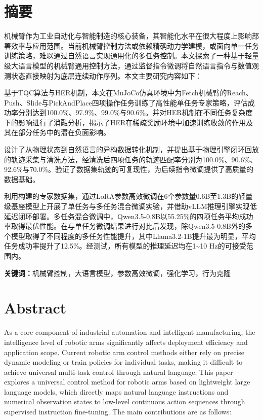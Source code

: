 \section*{摘要}

    机械臂作为工业自动化与智能制造的核心装备，其智能化水平在很大程度上影响部署效率与应用范围。当前机械臂控制方法或依赖精确动力学建模，或面向单一任务训练策略，难以通过自然语言实现通用化的多任务控制。本文探索了一种基于轻量级大语言模型的机械臂通用控制方法，通过监督指令微调将自然语言指令与数值观测状态直接映射为底层连续动作序列。本文主要研究内容如下：
    
    基于TQC算法与HER机制，本文在MuJoCo仿真环境中为Fetch机械臂的Reach、Push、Slide与PickAndPlace四项操作任务训练了高性能单任务专家策略，评估成功率分别达到100.0\%、97.9\%、99.0\%与90.6\%。并对HER机制在不同任务复杂度下的影响进行了消融分析，揭示了HER在稀疏奖励环境中加速训练收敛的作用及其在部分任务中的潜在负面影响。
    
    设计了从物理状态到自然语言的异构数据转化机制，并提出基于物理引擎闭环回放的轨迹采集与清洗方法，经清洗后四项任务的轨迹匹配率分别为100.0\%、90.6\%、92.6\%与70.0\%。验证了数据集轨迹的可复现性，为后续指令微调提供了高质量的数据基础。

    利用构建的专家数据集，通过LoRA参数高效微调在6个参数量0.6B至1.3B的轻量级基座模型上开展了单任务与多任务混合微调实验，并借助vLLM推理引擎实现低延迟闭环部署。多任务混合微调中，Qwen3.5-0.8B以55.25\%的四项任务平均成功率取得最优性能。在与单任务微调结果进行对比后发现，除Qwen3.5-0.8B外的多个模型取得了不同程度的多任务性能提升，其中Llama3.2-1B提升最为明显，平均任务成功率提升了12.5\%。经测试，所有模型的推理延迟均在1\textasciitilde10 Hz的可接受范围内。



\noindent\textbf{关键词：}机械臂控制，大语言模型，参数高效微调，强化学习，行为克隆

\section*{Abstract}

    As a core component of industrial automation and intelligent manufacturing, the intelligence level of robotic arms significantly affects deployment efficiency and application scope. Current robotic arm control methods either rely on precise dynamic modeling or train policies for individual tasks, making it difficult to achieve universal multi-task control through natural language. This paper explores a universal control method for robotic arms based on lightweight large language models, which directly maps natural language instructions and numerical observation states to low-level continuous action sequences through supervised instruction fine-tuning. The main contributions are as follows:

